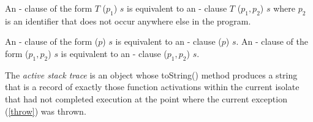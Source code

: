 \documentclass{article}
\newcommand{\code}[1]{{\sf #1}}
\begin{document}
\begin{itemize}
\LMHash{}
An \ON{}-\CATCH{} clause of the form  \code{\ON{} $T$ \CATCH{} ($p_1$) $s$} is equivalent to an \ON{}-\CATCH{} clause  \code{\ON{} $T$ \CATCH{} ($p_1, p_2$) $s$} where $p_2$ is an identifier that does not occur anywhere else in the program.


\LMHash{}
An \ON{}-\CATCH{} clause of the form  \code{\CATCH{} ($p$) $s$} is equivalent to an \ON{}-\CATCH{} clause  \code{\ON{} \DYNAMIC{} \CATCH{} ($p$) $s$}. An \ON{}-\CATCH{} clause of the form  \code{\CATCH{} ($p_1, p_2$) $s$} is equivalent to an \ON{}-\CATCH{} clause  \code{\ON{} \DYNAMIC{} \CATCH{} ($p_1, p_2$) $s$}.



\LMHash{}
The {\em active stack trace} is an object whose \code{toString()} method produces a string that is a record of exactly those function activations within the current isolate that had not completed execution at the point where the current exception (\ref{throw}) was thrown.





\end{itemize}
\end{document}
